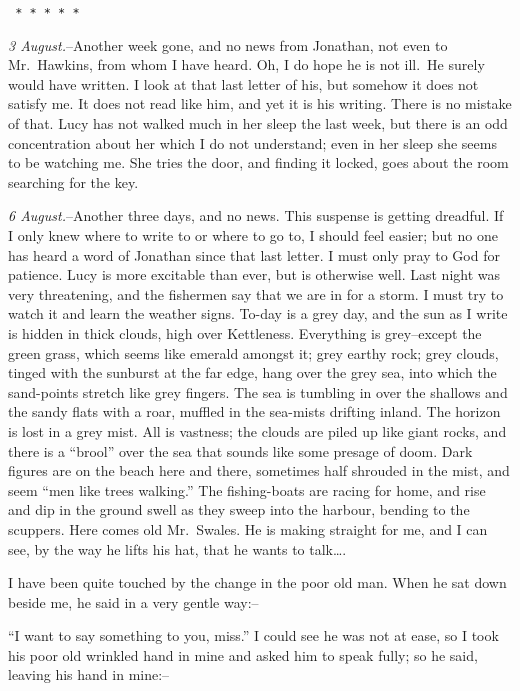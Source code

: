 \documentclass[12pt,openright]{book}
\begin{document}
\texttt{   *       *       *       *       *}

\textit{3 August.}–Another week gone, and no news from Jonathan, not even to Mr. Hawkins, from whom I have heard. Oh, I do hope he is not ill. He surely would have written. I look at that last letter of his, but somehow it does not satisfy me. It does not read like him, and yet it is his writing. There is no mistake of that. Lucy has not walked much in her sleep the last week, but there is an odd concentration about her which I do not understand; even in her sleep she seems to be watching me. She tries the door, and finding it locked, goes about the room searching for the key.

\textit{6 August.}–Another three days, and no news. This suspense is getting dreadful. If I only knew where to write to or where to go to, I should feel easier; but no one has heard a word of Jonathan since that last letter. I must only pray to God for patience. Lucy is more excitable than ever, but is otherwise well. Last night was very threatening, and the fishermen say that we are in for a storm. I must try to watch it and learn the weather signs. To-day is a grey day, and the sun as I write is hidden in thick clouds, high over Kettleness. Everything is grey–except the green grass, which seems like emerald amongst it; grey earthy rock; grey clouds, tinged with the sunburst at the far edge, hang over the grey sea, into which the sand-points stretch like grey fingers. The sea is tumbling in over the shallows and the sandy flats with a roar, muffled in the sea-mists drifting inland. The horizon is lost in a grey mist. All is vastness; the clouds are piled up like giant rocks, and there is a “brool” over the sea that sounds like some presage of doom. Dark figures are on the beach here and there, sometimes half shrouded in the mist, and seem “men like trees walking.” The fishing-boats are racing for home, and rise and dip in the ground swell as they sweep into the harbour, bending to the scuppers. Here comes old Mr. Swales. He is making straight for me, and I can see, by the way he lifts his hat, that he wants to talk….

I have been quite touched by the change in the poor old man. When he sat down beside me, he said in a very gentle way:–

“I want to say something to you, miss.” I could see he was not at ease, so I took his poor old wrinkled hand in mine and asked him to speak fully; so he said, leaving his hand in mine:–
\end{document}
